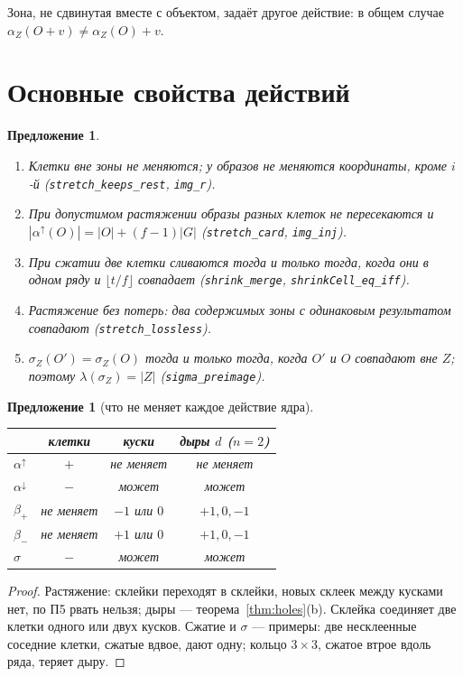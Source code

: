 \documentclass[11pt,a4paper]{article}
\theoremstyle{plain}
\newtheorem{proposition}[theorem]{Предложение}
\theoremstyle{definition}
\theoremstyle{remark}
\newcommand{\lean}[1]{\texttt{#1}}
\begin{document}
Зона, не сдвинутая вместе с объектом, задаёт другое действие: в общем случае $\alpha_Z(O+v)\neq\alpha_Z(O)+v$.

\section{Основные свойства действий}\label{sec:props}

\begin{proposition}\label{prop:basic}
\begin{enumerate}[label=\upshape(\alph*)]
\item Клетки вне зоны не меняются; у образов не меняются координаты, кроме $i$-й (\lean{stretch\_keeps\_rest}, \lean{img\_r}).
\item При допустимом растяжении образы разных клеток не пересекаются и $|\alpha^\uparrow(O)|=|O|+(f-1)|G|$ (\lean{stretch\_card}, \lean{img\_inj}).
\item При сжатии две клетки сливаются тогда и только тогда, когда они в одном ряду и $\lfloor t/f\rfloor$ совпадает (\lean{shrink\_merge}, \lean{shrinkCell\_eq\_iff}).
\item Растяжение без потерь: два содержимых зоны с одинаковым результатом совпадают (\lean{stretch\_lossless}).
\item $\sigma_Z(O')=\sigma_Z(O)$ тогда и только тогда, когда $O'$ и $O$ совпадают вне $Z$; поэтому $\lambda(\sigma_Z)=|Z|$ (\lean{sigma\_preimage}).
\end{enumerate}
\end{proposition}

\begin{proposition}[что не меняет каждое действие ядра]
\begin{center}
\begin{tabular}{lccc}
\toprule
& клетки & куски & дыры $d$ ($n=2$)\\
\midrule
$\alpha^\uparrow$ & $+$ & не меняет & не меняет\\
$\alpha^\downarrow$ & $-$ & может & может\\
$\beta_+$ & не меняет & $-1$ или $0$ & $+1,0,-1$\\
$\beta_-$ & не меняет & $+1$ или $0$ & $+1,0,-1$\\
$\sigma$ & $-$ & может & может\\
\bottomrule
\end{tabular}
\end{center}
\end{proposition}
\begin{proof}
Растяжение: склейки переходят в склейки, новых склеек между кусками нет, по П5 рвать нельзя; дыры — теорема~\ref{thm:holes}(b). Склейка соединяет две клетки одного или двух кусков. Сжатие и $\sigma$ — примеры: две несклеенные соседние клетки, сжатые вдвое, дают одну; кольцо $3\times3$, сжатое втрое вдоль ряда, теряет дыру.
\end{proof}
\end{document}
